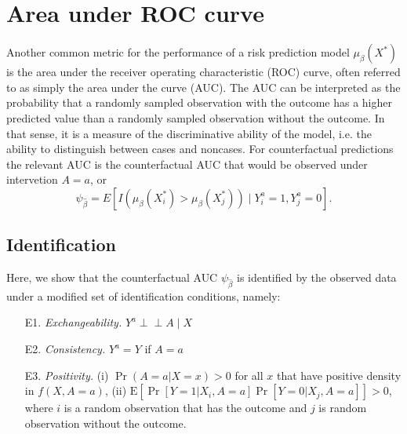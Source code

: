 \section{Area under ROC curve}\label{sec:auc}
Another common metric for the performance of a risk prediction model $\mu_\beta(X^*)$ is the area under the receiver operating characteristic (ROC) curve, often referred to as simply the area under the curve (AUC). The AUC can be interpreted as the probability that a randomly sampled observation with the outcome has a higher predicted value than a randomly sampled observation without the outcome. In that sense, it is a measure of the discriminative ability of the model, i.e. the ability to distinguish between cases and noncases. For counterfactual predictions the relevant AUC is the counterfactual AUC that would be observed under intervetion $A=a$, or
\begin{equation}\label{eqn:auc_estimand}
    \psi_{\widehat{\beta}} = E[I\left(\mu_\beta(X^*_i) > \mu_\beta(X^*_j)\right) \mid Y_i^a = 1, Y_j^a = 0].
\end{equation}

\subsection{Identification}
Here, we show that the counterfactual AUC $\psi_{\widehat{\beta}}$ is identified by the observed data under a modified set of identification conditions, namely:
\begin{enumerate}
    \item[E1.] \textit{Exchangeability.} $Y^a \perp\!\!\!\perp A \mid X$ 
    \item[E2.] \textit{Consistency.} $Y^a = Y$ if $A = a$
    \item[E3.] \textit{Positivity.} (i) $\Pr(A = a | X = x) > 0$ for all $x$ that have positive density in $f(X, A = a)$, (ii) $\mathrm{E}\left[\Pr[Y = 1 | X_i, A = a]\Pr[Y = 0 | X_j, A = a]\right] > 0 $, where $i$ is a random observation that has the outcome and $j$ is random observation without the outcome.
\end{enumerate}


